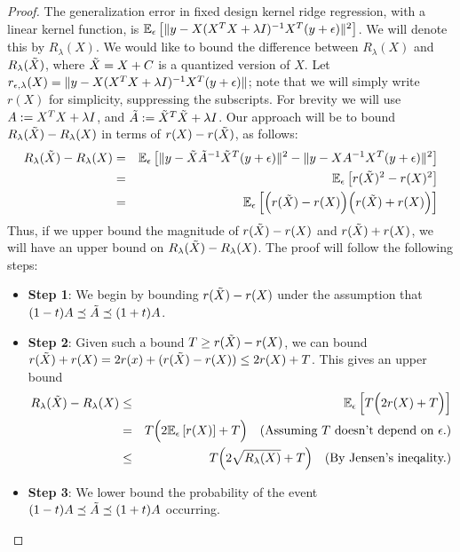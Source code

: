 \documentclass[12pt]{article}
\begin{document}
\begin{proof}
	The generalization error in fixed design kernel ridge regression, with a linear kernel function, is $\expect{\eps}{\|y-X(X^T X + \lambda I)^{-1} X^T (y+\eps)\|^2}$.  We will denote this by $R_{\lambda}(X)$.  We would like to bound the difference between $R_{\lambda}(X)$ and $R_{\lambda}(\tX)$, where $\tX = X+C$ is a quantized version of $X$.  Let $r_{\eps,\lambda}(X) = \|y-X(X^T X + \lambda I)^{-1} X^T (y+\eps)\|$; note that we will simply write $r(X)$ for simplicity, suppressing the subscripts. For brevity we will use $A \defeq X^T X + \lambda I$, and $\tA \defeq \tX^T \tX + \lambda I$.  Our approach will be to bound $R_{\lambda}(\tX) - R_{\lambda}(X)$ in terms of $r(X) - r(\tX)$, as follows:
	\begin{eqnarray*}
		R_{\lambda}(\tX) - R_{\lambda}(X) &=& \expect{\eps}{\|y-\tX\tA^{-1} \tX^T (y+\eps)\|^2-\|y-XA^{-1} X^T (y+\eps)\|^2 } \\
		&=& \expect{\eps}{r(\tX)^2 - r(X)^2} \\
		&=& \expect{\eps}{\Big(r(\tX) - r(X)\Big)\Big(r(\tX)+r(X)\Big)}
	\end{eqnarray*}
	Thus, if we upper bound the magnitude of $r(\tX) - r(X)$ and $r(\tX) + r(X)$, we will have an upper bound on $R_{\lambda}(\tX) - R_{\lambda}(X)$. The proof will follow the following steps:
	\begin{itemize}
		\item \textbf{Step 1}: We begin by bounding $r(\tX) - r(X)$ under the assumption that $(1-t)A \preceq \tA \preceq (1+t)A$.
		\item \textbf{Step 2}: Given such a bound $T \geq r(\tX) - r(X)$, we can bound $r(\tX) + r(X) = 2r(x) + (r(\tX) - r(X)) \leq 2r(X) + T$.  This gives an upper bound
		\begin{eqnarray*}
			R_{\lambda}(\tX) - R_{\lambda}(X) &\leq& \expect{\eps}{T\Big(2r(X)+T\Big)}\\
			&=& T\Big(2\expect{\eps}{r(X)}+T\Big) \quad \text{(Assuming $T$ doesn't depend on $\eps$.)}\\
			&\leq& T\Big(2\sqrt{R_{\lambda}(X)}+T\Big) \quad \text{(By Jensen's ineqality.)}
		\end{eqnarray*}
		\item \textbf{Step 3}: We lower bound the probability of the event  $(1-t)A \preceq \tA \preceq (1+t)A$ occurring.
	\end{itemize}
	

\end{proof}
\end{document}
